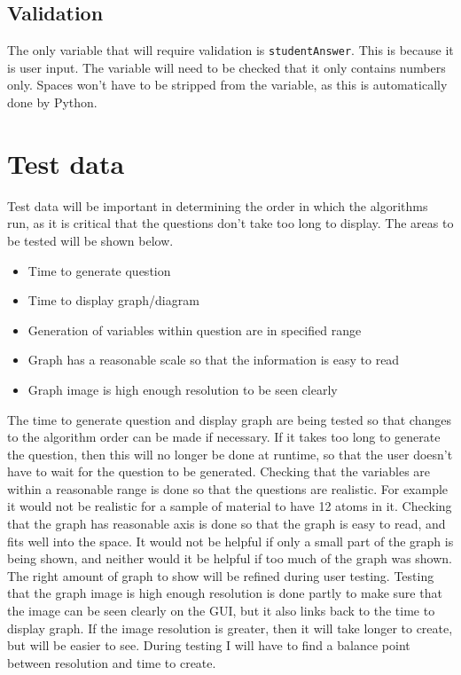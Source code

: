 \subsection{Validation}
The only variable that will require validation is \texttt{studentAnswer}. This is because it is user input. The variable will need to be checked that it only contains numbers only. Spaces won't have to be stripped from the variable, as this is automatically done by Python.
\section{Test data}
Test data will be important in determining the order in which the algorithms run, as it is critical that the questions don't take too long to display. The areas to be tested will be shown below.
\begin{itemize}
	\item Time to generate question
	\item Time to display graph/diagram
	\item Generation of variables within question are in specified range
	\item Graph has a reasonable scale so that the information is easy to read
	\item Graph image is high enough resolution to be seen clearly
\end{itemize}
The time to generate question and display graph are being tested so that changes to the algorithm order can be made if necessary. If it takes too long to generate the question, then this will no longer be done at runtime, so that the user doesn’t have to wait for the question to be generated. Checking that the variables are within a reasonable range is done so that the questions are realistic. For example it would not be realistic for a sample of material to have 12 atoms in it. Checking that the graph has reasonable axis is done so that the graph is easy to read, and fits well into the space. It would not be helpful if only a small part of the graph is being shown, and neither would it be helpful if too much of the graph was shown. The right amount of graph to show will be refined during user testing. Testing that the graph image is high enough resolution is done partly to make sure that the image can be seen clearly on the GUI, but it also links back to the time to display graph. If the image resolution is greater, then it will take longer to create, but will be easier to see. During testing I will have to find a balance point between resolution and time to create.
